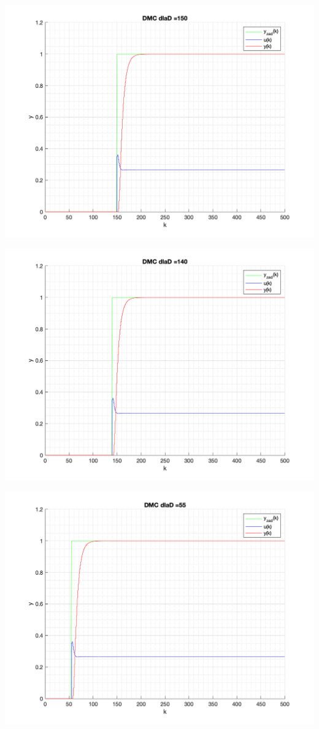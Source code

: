 \documentclass[a4paper, 11pt]{article}
\begin{document}
\begin{enumerate}
 \includegraphics[width=\linewidth]{./ModelsP4_D/P4_DMC_D_150_png.png} 
 
 \includegraphics[width=\linewidth]{./ModelsP4_D/P4_DMC_D_140_png.png} 
 
 \includegraphics[width=\linewidth]{./ModelsP4_D/P4_DMC_D_55_png.png} 
 

\end{enumerate}
\end{document}
